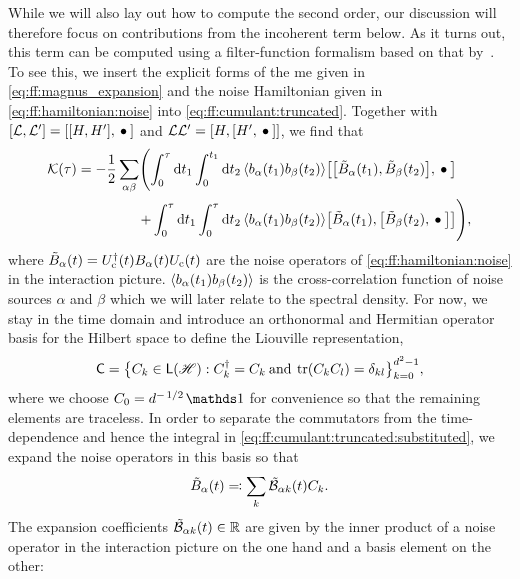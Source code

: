 While we will also lay out how to compute the second order, our discussion will therefore focus on contributions from the incoherent term below.
As it turns out, this term can be computed using a filter-function formalism based on that by~\citet{Green2013}.
To see this, we insert the explicit forms of the \gls{me} given in \cref{eq:ff:magnus_expansion} and the noise Hamiltonian given in \cref{eq:ff:hamiltonian:noise} into \cref{eq:ff:cumulant:truncated}.
Together with $\comm{\mc{L}}{\mc{L}'} = \comm{\comm{H}{H'}}{\placeholder}$ and $\mc{L}\mc{L}' = \comm{H}{\comm{H'}{\placeholder}}$, we find that
\begin{align}
    \cumulantfun(\tau) = -\frac{1}{2}\sum_{\alpha\beta}\Biggl(\int_0^\tau\dd{t_1}\int_0^{t_1}\dd{t_2}
        \expval{b_\alpha(t_1) b_\beta(t_2)} & \comm{\comm{\tilde{B}_\alpha(t_1)}{\tilde{B}_\beta(t_2)}}{\placeholder} \notag\\
        +\int_0^\tau\dd{t_1}\int_0^\tau\dd{t_2}
        \expval{b_\alpha(t_1) b_\beta(t_2)} & \comm{\tilde{B}_\alpha(t_1)}{\comm{\tilde{B}_\beta(t_2)}{\placeholder}}\Biggr), \label{eq:ff:cumulant:truncated:substituted}
\end{align}
where $\tilde{B}_\alpha(t) = U_{\mathrm{c}}^\dagger(t)B_\alpha(t)U_{\mathrm{c}}(t)$ are the noise operators of \cref{eq:ff:hamiltonian:noise} in the interaction picture.
$\ev{b_\alpha(t_1)b_\beta(t_2)}$ is the cross-correlation function of noise sources $\alpha$ and $\beta$ which we will later relate to the spectral density.
For now, we stay in the time domain and introduce an orthonormal and Hermitian operator basis for the Hilbert space \Hspace to define the Liouville representation,
\begin{equation}\label{eq:ff:basis}
    \mathsf{C} = \bigl\lbrace C_k\in\mathsf{L}(\mathscr{H}): C_k^\dagger = C_k\:\text{and}\:\tr(C_k C_l) = \delta_{kl}\bigr\rbrace_{k=0}^{d^2-1},
\end{equation}
where we choose $C_0 = d^{-\flatfrac{1}{2}}\eye$ for convenience so that the remaining elements are traceless.
In order to separate the commutators from the time-dependence and hence the integral in \cref{eq:ff:cumulant:truncated:substituted}, we expand the noise operators in this basis so that
\begin{equation}\label{eq:ff:noise_operators:expanded}
    \tilde{B}_\alpha(t) \eqqcolon \sum_k\tilde{\mathcal{B}}_{\alpha k}(t) C_k.
\end{equation}
The expansion coefficients $\tilde{\mathcal{B}}_{\alpha k}(t)\in\mathbb{R}$ are given by the inner product of a noise operator in the interaction picture on the one hand and a basis element on the other:
